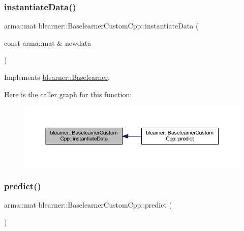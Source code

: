 \subsubsection{\texorpdfstring{instantiate\+Data()}{instantiateData()}}
{\footnotesize\ttfamily arma\+::mat blearner\+::\+Baselearner\+Custom\+Cpp\+::instantiate\+Data (\begin{DoxyParamCaption}\item[{const arma\+::mat \&}]{newdata }\end{DoxyParamCaption})\hspace{0.3cm}{\ttfamily [virtual]}}



Implements \mbox{\hyperlink{classblearner_1_1_baselearner_af01f1b8c4540927705ff79c3649489f7}{blearner\+::\+Baselearner}}.

Here is the caller graph for this function\+:\nopagebreak
\begin{figure}[H]
\begin{center}
\leavevmode
\includegraphics[width=350pt]{classblearner_1_1_baselearner_custom_cpp_ae130d3b469eff32c8e0be12d925cf88f_icgraph}
\end{center}
\end{figure}
\mbox{\label{classblearner_1_1_baselearner_custom_cpp_a88c17ed1e32255e482f34695e06e7d25}} 
\subsubsection{\texorpdfstring{predict()}{predict()}\hspace{0.1cm}{\footnotesize\ttfamily [1/2]}}
{\footnotesize\ttfamily arma\+::mat blearner\+::\+Baselearner\+Custom\+Cpp\+::predict (\begin{DoxyParamCaption}{ }\end{DoxyParamCaption})\hspace{0.3cm}{\ttfamily [virtual]}}



